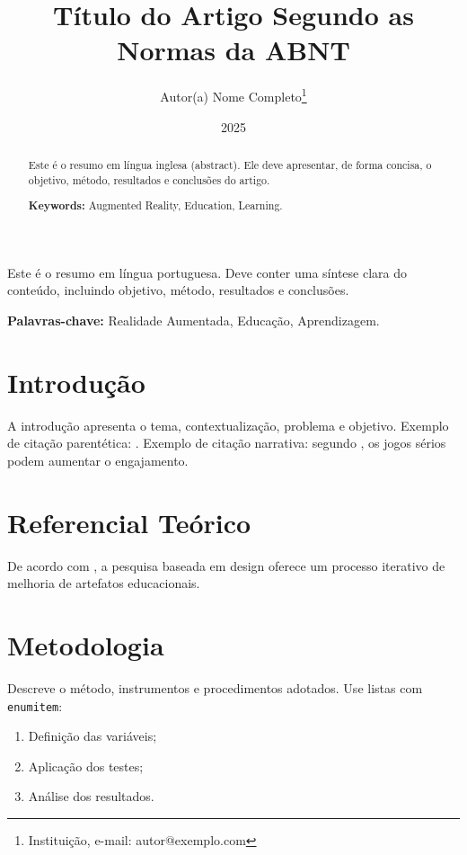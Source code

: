 \documentclass[12pt,oneside]{abntex2}
\title{Título do Artigo Segundo as Normas da ABNT}
\author{Autor(a) Nome Completo\thanks{Instituição, e-mail: autor@exemplo.com}}
\date{2025}
\begin{document}
\maketitle

\begin{abstract}
Este é o resumo em língua inglesa (abstract). Ele deve apresentar, de forma concisa, o objetivo, método, resultados e conclusões do artigo.

\textbf{Keywords:} Augmented Reality, Education, Learning.
\end{abstract}

\begin{resumo}
Este é o resumo em língua portuguesa. Deve conter uma síntese clara do conteúdo, incluindo objetivo, método, resultados e conclusões.

\textbf{Palavras-chave:} Realidade Aumentada, Educação, Aprendizagem.
\end{resumo}

\section{Introdução}
A introdução apresenta o tema, contextualização, problema e objetivo.  
Exemplo de citação parentética: \cite{albuquerqueToyUserInterfaces2021}.  
Exemplo de citação narrativa: segundo \textcite{aragaoEnsinoProgramacaoPensamento2023}, os jogos sérios podem aumentar o engajamento.
\section{Referencial Teórico}
De acordo com \cite{pimentelDesignScienceResearch2020}, a pesquisa baseada em design oferece um processo iterativo de melhoria de artefatos educacionais.

\section{Metodologia}
Descreve o método, instrumentos e procedimentos adotados.  
Use listas com \texttt{enumitem}:
\begin{enumerate}[label=\alph*)]
  \item Definição das variáveis;
  \item Aplicação dos testes;
  \item Análise dos resultados.
\end{enumerate}
\end{document}
